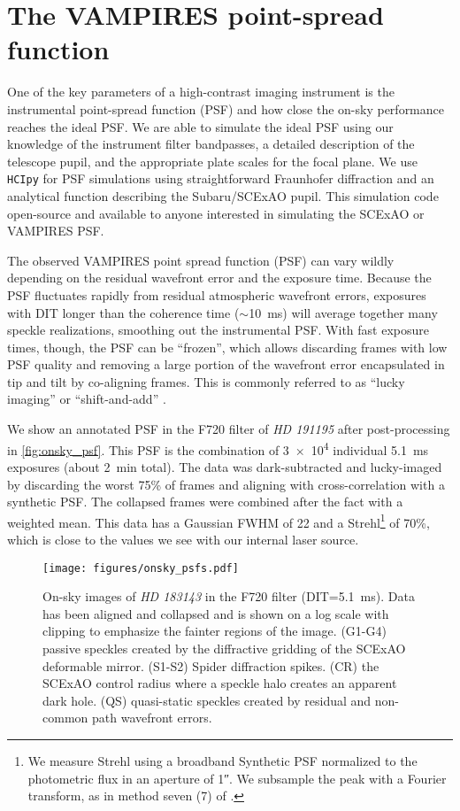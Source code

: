 \section{The VAMPIRES point-spread function}\label{sec:psf}

One of the key parameters of a high-contrast imaging instrument is the instrumental point-spread function (PSF) and how close the on-sky performance reaches the ideal PSF. We are able to simulate the ideal PSF using our knowledge of the instrument filter bandpasses, a detailed description of the telescope pupil, and the appropriate plate scales for the focal plane. We use \texttt{HCIpy} \citep{por_high_2018} for PSF simulations using straightforward Fraunhofer diffraction and an analytical function describing the Subaru/SCExAO pupil. This simulation code open-source and available to anyone interested in simulating the SCExAO or VAMPIRES PSF.

The observed VAMPIRES point spread function (PSF) can vary wildly depending on the residual wavefront error and the exposure time. Because the PSF fluctuates rapidly from residual atmospheric wavefront errors, exposures with DIT longer than the coherence time ($\sim$\SI{10}{\milli\second}) will average together many speckle realizations, smoothing out the instrumental PSF. With fast exposure times, though, the PSF can be ``frozen'', which allows discarding frames with low PSF quality and removing a large portion of the wavefront error encapsulated in tip and tilt by co-aligning frames. This is commonly referred to as ``lucky imaging'' or ``shift-and-add'' \citep{garrel_highly_2012}.

We show an annotated PSF in the F720 filter of \textit{HD 191195} after post-processing in \autoref{fig:onsky_psf}. This PSF is the combination of \num{3e4} individual \SI{5.1}{\milli\second} exposures (about \SI{2}{\minute} total). The data was dark-subtracted and lucky-imaged by discarding the worst 75\% of frames and aligning with cross-correlation with a synthetic PSF. The collapsed frames were combined after the fact with a weighted mean. This data has a Gaussian FWHM of \SI{22}{\mas} and a Strehl\footnote{We measure Strehl using a broadband Synthetic PSF normalized to the photometric flux in an aperture of \ang{;;1}.  We subsample the peak with a Fourier transform, as in method seven (7) of \citep{jr_is_2004}.} of 70\%, which is close to the values we see with our internal laser source.

\begin{figure}
    \centering
    \texttt{[image: figures/onsky\_psfs.pdf]}
    \caption{On-sky images of \textit{HD 183143} in the F720 filter (DIT=\SI{5.1}{\milli\second}). Data has been aligned and collapsed and is shown on a log scale with clipping to emphasize the fainter regions of the image. (G1-G4) passive speckles created by the diffractive gridding of the SCExAO deformable mirror. (S1-S2) Spider diffraction spikes. (CR) the SCExAO control radius where a speckle halo creates an apparent dark hole. (QS) quasi-static speckles created by residual and non-common path wavefront errors.\label{fig:onsky_psf}}
\end{figure}

